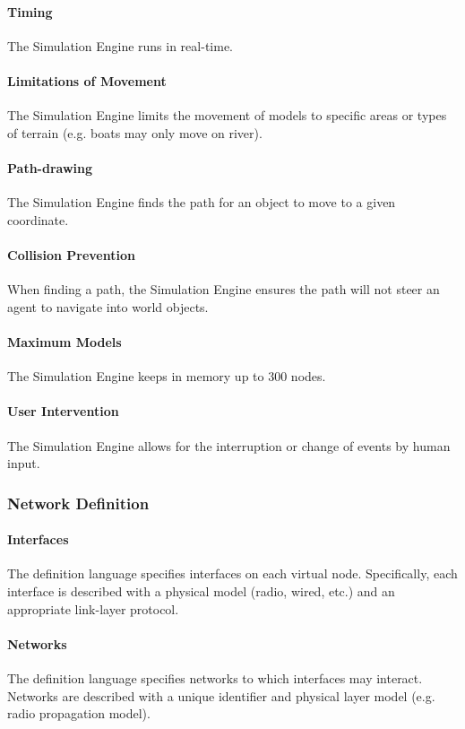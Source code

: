 \documentclass[titlepage]{article}
\begin{document}
    \paragraph{Timing} The Simulation Engine runs in real-time.
    \paragraph{Limitations of Movement} The Simulation Engine limits the movement of models to specific areas or types of terrain (e.g. boats may only move on river).
    \paragraph{Path-drawing} The Simulation Engine finds the path for an object to move to a given coordinate.
    \paragraph{Collision Prevention} When finding a path, the Simulation Engine ensures the path will not steer an agent to navigate into world objects.
    \paragraph{Maximum Models} The Simulation Engine keeps in memory up to 300 nodes.
    \paragraph{User Intervention} The Simulation Engine allows for the interruption or change of events by human input.

\subsubsection{Network Definition}
	\paragraph{Interfaces} The definition language specifies interfaces on each virtual node.  Specifically, each interface is described with a physical model (radio, wired, etc.) and an appropriate link-layer protocol.
	\paragraph{Networks} The definition language specifies networks to which interfaces may interact.  Networks are described with a unique identifier and physical layer model (e.g. radio propagation model).
\end{document}
